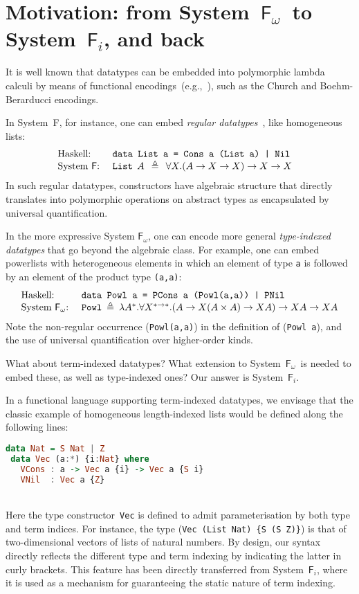 \documentclass{llncs}
\newcommand{\Fi}{\ensuremath{\mathsf{F}_i}}
\newcommand{\Fw}{\ensuremath{\mathsf{F}_\omega}}
\begin{document}
\section{Motivation: from System~\Fw\ to System~\Fi, and back}
\label{sec:motiv}
It is well known that datatypes can be embedded into polymorphic lambda
calculi by means of functional encodings~(e.g.,~\cite{AbeMatUus03}), such
as the Church and Boehm-Berarducci encodings.

In System~\textsf{F}, for instance, one can embed \emph{regular
datatypes}~\cite{BoehmBerarducci}, like homogeneous lists:
\[
\begin{array}{ll}
\text{Haskell:} & \texttt{data List a = Cons a (List a) | Nil} \\
\text{System \textsf{F}:}~& 
\texttt{{List}}\:\: A\:\:\triangleq\:\:
\forall X.
(A\to X\to X) \to X \to X ~~\; 
\end{array}
\]
In such regular datatypes, constructors have algebraic structure that
directly translates into polymorphic operations on abstract types as
encapsulated by universal quantification.

In the more expressive System \Fw, one can encode more general
\emph{type-indexed datatypes} that go beyond the algebraic class.
For example, one can embed powerlists with
heterogeneous elements in which an element of type \texttt{a} is followed by
an element of the product type \texttt{(a,a)}:
\[
\begin{array}{ll}
\text{Haskell:} & \texttt{data Powl a = 
	PCons a (Powl(a,a))
	| 
	PNil 
} \\
\text{System \Fw:}~& \texttt{{Powl}}\:\triangleq\:
\lambda A^{*}.\forall X^{*\to*}. (A\to X(A\times A)\to X A) \to X A \to XA
\end{array}
\]
Note the non-regular occurrence (\texttt{Powl(a,a)}) in the definition of
(\texttt{Powl a}), and the use of universal quantification over
higher-order kinds.

What about term-indexed datatypes?  What extension to System~\Fw\ is
needed to embed these, as well as type-indexed ones?  Our answer is
System~\Fi.

In a functional language supporting term-indexed datatypes, we envisage
that the classic example of homogeneous length-indexed lists would be
defined along the following lines:\vspace{-5pt}
\begin{lstlisting}[basicstyle={\ttfamily},language=Haskell]
 data Nat = S Nat | Z 
 data Vec (a:*) {i:Nat} where
   VCons : a -> Vec a {i} -> Vec a {S i}
   VNil  : Vec a {Z}
\end{lstlisting}~\vspace{-15pt}\\ \noindent
Here the type constructor~{\tt Vec} is defined to admit parameterisation
by both type and term indices.  For instance, the type 
(\verb|Vec (List Nat) {S (S Z)}|) is that of two-dimensional
vectors of lists of natural numbers.  By design, our syntax directly
reflects the different type and term indexing by indicating the latter in
curly brackets.  This feature has been directly transferred from
System~\Fi, where it is used as a mechanism for guaranteeing the static
nature of term indexing.
\end{document}
